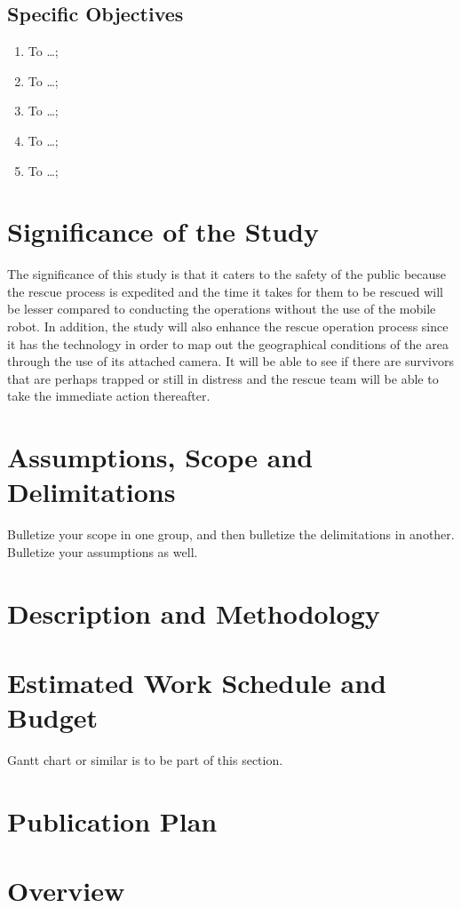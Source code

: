 \subsection{Specific Objectives}

\begin{enumerate}
	\item To  \ldots;
	
	\item To  \ldots;
	
	\item To  \ldots;
	
	\item To  \ldots;
	
	\item To  \ldots;
\end{enumerate}



\section{Significance of the Study}


	The significance of this study is that it caters to the safety of the public because the rescue process is expedited and the time it takes for them to be rescued will be lesser compared to conducting the operations without the use of the mobile robot. In addition, the study will also enhance the rescue operation process since it has the technology in order to map out the geographical conditions of the area through the use of its attached camera. It will be able to see if there are survivors that are perhaps trapped or still in distress and the rescue team will be able to take the immediate action thereafter.



\section{Assumptions, Scope and Delimitations}

Bulletize your scope in one group, and then bulletize the delimitations in another.  Bulletize your assumptions as well.


\section{Description and Methodology}



\ifFinished
\else

\section{Estimated Work Schedule and Budget}

Gantt chart or similar is to be part of this section.


\section{Publication Plan}

\fi


\section{Overview}




